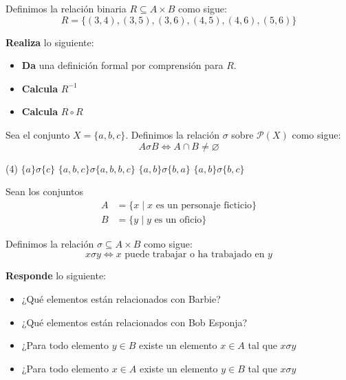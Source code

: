 \documentclass[oneside]{style}
\begin{document}
\begin{questions}[label=\protect\circled{\bfseries\arabic*}]
{        Definimos la relación binaria $R \subseteq A \times B$ como 
        sigue:
        \begin{equation*}
            R = \{(3,4), (3,5), (3,6), (4,5), (4,6), (5,6)\}
        \end{equation*}

        \textbf{Realiza} lo siguiente:
        \begin{itemize}
            \item \textbf{Da} una definición formal por comprensión para $R$.
            \item \textbf{Calcula} $R^{-1}$
            \item \textbf{Calcula} $R \circ R$
        \end{itemize}
    }


    \question
    {
        Sea el conjunto $X = \{a,b,c\}$. Definimos la relación $\sigma$ sobre 
        $\mathcal{P}(X)$ como sigue:
        \begin{equation*}
            A \sigma B \Leftrightarrow A \cap B \neq \varnothing
        \end{equation*}

        \begin{tasks}(4)
            \task $\{a\} \sigma \{c\}$
            \task $\{a,b,c\} \sigma \{a,b,b,c\}$
            \task $\{a,b\} \sigma \{b,a\}$
            \task $\{a,b\} \sigma \{b,c\}$
        \end{tasks}
    }

    \question
    {
        Sean los conjuntos
        \begin{align*}
            A &= \{x \; | \; x \text{ es un personaje ficticio}\} \\ 
            B &= \{y \; | \; y \text{ es un oficio}\}
        \end{align*}
        
        Definimos la relación $\sigma \subseteq A \times B$ como sigue:
        \begin{equation*}
            x \sigma y \Leftrightarrow x \text{ puede trabajar o ha trabajado 
            en } y
        \end{equation*}

        \textbf{Responde} lo siguiente:
        \begin{itemize}
            \item ¿Qué elementos están relacionados con Barbie?
            \item ¿Qué elementos están relacionados con Bob Esponja?
            \item ¿Para todo elemento $y \in B$ existe un elemento 
            $x \in A$ tal que $x \sigma y$
            \item ¿Para todo elemento $x \in A$ existe un elemento 
            $y \in B$ tal que $x \sigma y$
        \end{itemize}
    }


\end{questions}
\end{document}
